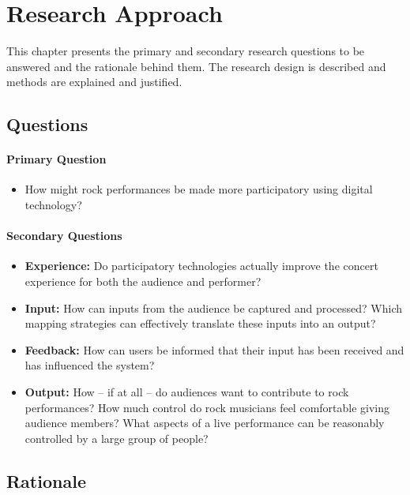 \chapter{Research Approach}

This chapter presents the primary and secondary research questions to be answered and the rationale behind them. The research design is described and methods are explained and justified.

\section{Questions}

\subsubsection{Primary Question}

\begin{itemize}
	\item How might rock performances be made more participatory using digital technology?
\end{itemize}

\subsubsection{Secondary Questions}

\begin{itemize}
	\item \textbf{Experience:} Do participatory technologies actually improve the concert experience for both the audience and performer?

	\item \textbf{Input:} How can inputs from the audience be captured and processed? Which mapping strategies can effectively translate these inputs into an output?

	\item \textbf{Feedback:} How can users be informed that their input has been received and has influenced the system?

	\item \textbf{Output:} How -- if at all -- do audiences want to contribute to rock performances? How much control do rock musicians feel comfortable giving audience members? What aspects of a live performance can be reasonably controlled by a large group of people?
\end{itemize}


\section{Rationale}

